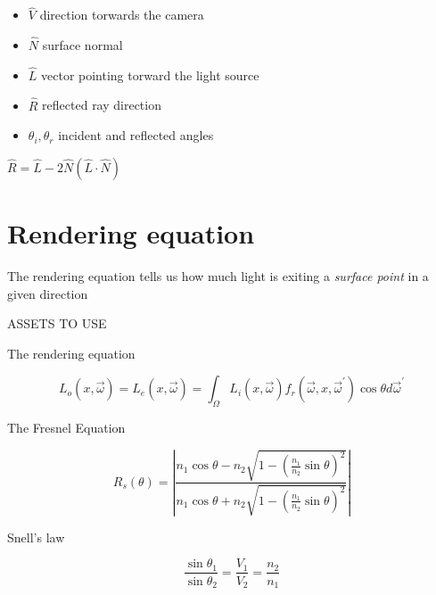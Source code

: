 \documentclass{article}
\begin{document}
\begin{itemize}
    \item \(\hat{V}\) direction torwards the camera
    \item \(\hat{N}\) surface normal
    \item \(\hat{L}\) vector pointing torward the light source
    \item \(\hat{R}\) reflected ray direction
    \item \({\theta}_i, {\theta}_r\) incident and reflected angles
\end{itemize}

\(\hat{R}=\hat{L}-2\hat{N}(\hat{L}\cdot\hat{N})\)


\pagebreak

\section{Rendering equation}

The rendering equation tells us how much light is exiting a \textit{surface point}
in a given direction

\pagebreak

ASSETS TO USE

The rendering equation

\[
    L_o(x, \vec{\omega})
    =L_e(x, \vec{\omega})
    =\int_\Omega L_i(x,\vec{\omega})f_r(\vec{\omega}, x, \vec{\omega}^{'})
    \cos \theta d\vec{\omega}^{'}
\]

The Fresnel Equation

\[
    R_s(\theta) =
        \left|
            \frac
            {
                n_1\cos \theta - n_2 \sqrt{1-{\left(\frac{n_1}{n_2}\sin \theta\right)}^2}
            }
            {
                n_1\cos \theta + n_2 \sqrt{1-{\left(\frac{n_1}{n_2}\sin \theta\right)}^2}
            }
        \right|
\]

Snell's law

\[
    \frac{\sin \theta_1}{\sin \theta_2}
    = \frac{V_1}{V_2}
    = \frac{n_2}{n_1}
\]

\pagebreak

\nocite{*} %

\printbibliography
\end{document}
